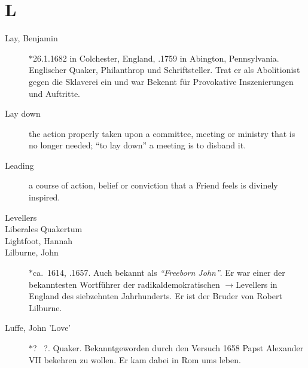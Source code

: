 \section*{L}

\articlesize

\begin{description}

 \item[Lay, Benjamin] $\ast$26.1.1682 in Colchester, England, .1759 in Abington, Pennsylvania. Englischer Quaker, Philanthrop und Schriftsteller. Trat er als Abolitionist gegen die Sklaverei ein und war Bekennt für Provokative Inszenierungen und Auftritte.

 \item[Lay down]
    the action properly taken upon a committee, meeting or ministry that is no longer needed; "`to lay down"' a meeting is to disband it.

 \item[Leading]
    a course of action, belief or conviction that a Friend feels is divinely inspired.

 \item[Levellers]


 \item[Liberales Quakertum]

 \item[Lightfoot, Hannah]

 \item[Lilburne, John] $\ast$ca.~1614, .1657. Auch bekannt als \textit{"`Freeborn John"'}. Er war einer der bekanntesten Wortführer der radikaldemokratischen $\to$Levellers in England des siebzehnten Jahrhunderts. Er ist der Bruder von Robert Lilburne.

 \item[Luffe, John 'Love'] $\ast$? \dag~?. Quaker. Bekanntgeworden durch den Versuch 1658 Papst Alexander VII bekehren zu wollen. Er kam dabei in Rom ums leben.

 \end{description}
\normalsize
